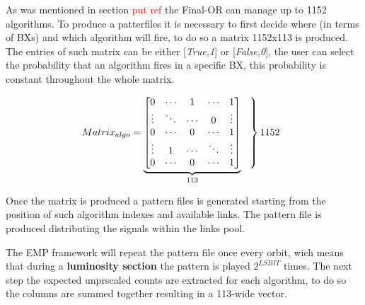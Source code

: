 \documentclass[a4paper,11pt]{article}
\begin{document}
As was mentioned in section \textcolor{red}{put ref} the Final-OR can manage up to 1152 algorithms. To produce a patterfiles it is necessary to first decide where (in terms of BXs) and which algorithm will fire, to do so a matrix 1152x113 is produced. The entries of such matrix can be either [\textit{True,1}] or [\textit{False,0}], the user can select the probability that an algorithm fires in a specific BX, this probability is constant throughout the whole matrix.

\[
Matrix_{algo}=
\underbrace{\begin{bmatrix}
    0  & \cdots & 1 & \cdots & 1      \\
    \vdots  & \ddots & \cdots & 0 & \vdots       \\
    0  &\cdots & 0 & \cdots & 1       \\
    \vdots  &1&\cdots & \ddots & \vdots       \\
    0  & \cdots & 0 & \cdots & 1       
\end{bmatrix}}_{113}
\begin{tabular}{l}
$\left.\lefteqn{\phantom{\begin{matrix} 0\\ \ddots\\ 0\\ \ddots\\ 0\  \end{matrix}}}\right\}1152$
\end{tabular}
\]

Once the matrix is produced a pattern files is generated starting from the position of such algorithm indexes and available links. The pattern file is produced distributing the signals within the links pool.  

The EMP framework will repeat the pattern file once every orbit, wich means that during a \textbf{luminosity section} the pattern is played $2^{LSBIT}$ times. The next step the expected unprscaled counts are extracted for each algorithm, to do so the columns are summed together resulting in a 113-wide vector.
\end{document}
